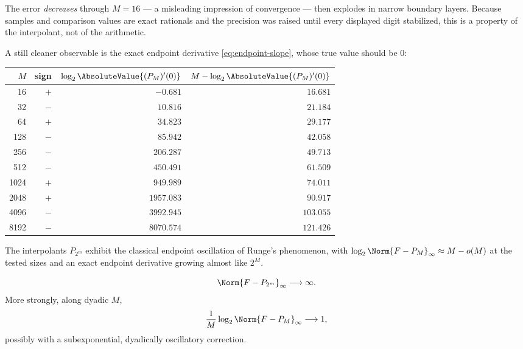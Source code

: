 The error \emph{decreases} through $M=16$ --- a misleading impression
of convergence --- then explodes in narrow boundary layers.  Because
samples and comparison values are exact rationals and the precision
was raised until every displayed digit stabilized, this is a property
of the interpolant, not of the arithmetic.

A still cleaner observable is the exact endpoint derivative
\eqref{eq:endpoint-slope}, whose true value should be $0$:

\begin{center}
\small
\begin{tabular}{rrrr}
\toprule
$M$ & sign & $\log_2\AbsoluteValue{(P_M)'(0)}$ & $M-\log_2\AbsoluteValue{(P_M)'(0)}$ \\
\midrule
16   & $+$ & $-0.681$   & $16.681$ \\
32   & $-$ & $10.816$   & $21.184$ \\
64   & $+$ & $34.823$   & $29.177$ \\
128  & $-$ & $85.942$   & $42.058$ \\
256  & $-$ & $206.287$  & $49.713$ \\
512  & $-$ & $450.491$  & $61.509$ \\
1024 & $+$ & $949.989$  & $74.011$ \\
2048 & $+$ & $1957.083$ & $90.917$ \\
4096 & $-$ & $3992.945$ & $103.055$ \\
8192 & $-$ & $8070.574$ & $121.426$ \\
\bottomrule
\end{tabular}
\label{tab:derivative-defect}
\end{center}

\begin{observation}
The interpolants $P_{2^{m}}$ exhibit the classical endpoint
oscillation of Runge's phenomenon, with
$\log_2\Norm{F-P_M}_\infty\approx M-o(M)$ at the tested sizes and an
exact endpoint derivative growing almost like $2^{M}$.
\end{observation}

\begin{conjecture}
\label{conj:runge-divergence}
\[
  \Norm{F-P_{2^{m}}}_\infty\longrightarrow\infty.
 \]
 More strongly, along dyadic $M$,
\[
  \frac1M\log_2\Norm{F-P_M}_\infty\longrightarrow1,
 \]
 possibly with a subexponential, dyadically oscillatory correction.
\end{conjecture}

